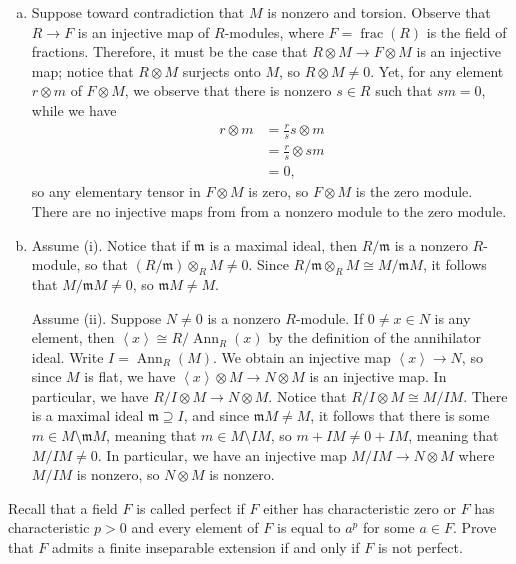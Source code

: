 \documentclass[10pt]{mypackage}
\begin{document}
\begin{solution}\hfill
  \begin{enumerate}[(a)]
    \item Suppose toward contradiction that $M$ is nonzero and torsion. Observe that $R\rightarrow F$ is an injective map of $R$-modules, where $F = \operatorname{frac}\left( R \right)$ is the field of fractions. Therefore, it must be the case that $R\otimes M\rightarrow F\otimes M$ is an injective map; notice that $R\otimes M$ surjects onto $M$, so $R\otimes M\neq 0$. Yet, for any element $r\otimes m$ of $F\otimes M$, we observe that there is nonzero $s\in R$ such that $sm = 0$, while we have
      \begin{align*}
        r\otimes m &= \frac{r}{s}s\otimes m\\
                   &= \frac{r}{s}\otimes sm\\
                   &= 0,
      \end{align*}
      so any elementary tensor in $F\otimes M$ is zero, so $F\otimes M$ is the zero module. There are no injective maps from from a nonzero module to the zero module.
    \item Assume (i). Notice that if $ \mathfrak{m} $ is a maximal ideal, then $R/ \mathfrak{m}$ is a nonzero $R$-module, so that $\left( R/ \mathfrak{m} \right)\otimes_{R}M\neq 0$. Since $R/ \mathfrak{m}\otimes_{R} M\cong M/ \mathfrak{m}M$, it follows that $ M/ \mathfrak{m}M\neq 0 $, so $ \mathfrak{m}M \neq M $.

      Assume (ii). Suppose $N\neq 0$ is a nonzero $R$-module. If $0\neq x\in N$ is any element, then $ \left\langle x \right\rangle\cong R/\operatorname{Ann}_R(x) $ by the definition of the annihilator ideal. Write $I = \operatorname{Ann}_R(M)$. We obtain an injective map $ \left\langle x \right\rangle\rightarrow N $, so since $M$ is flat, we have $ \left\langle x \right\rangle\otimes M\rightarrow N\otimes M $ is an injective map. In particular, we have $R/I\otimes M\rightarrow N\otimes M$. Notice that $R/I\otimes M\cong M/IM$. There is a maximal ideal $ \mathfrak{m}\supseteq I $, and since $ \mathfrak{m}M\neq M $, it follows that there is some $m\in M\setminus \mathfrak{m}M$, meaning that $m\in M\setminus IM$, so $m + IM\neq 0 + IM$, meaning that $M/IM\neq 0$. In particular, we have an injective map $M/IM\rightarrow N\otimes M$ where $M/IM$ is nonzero, so $N\otimes M$ is nonzero.
  \end{enumerate}
\end{solution}
\begin{problem}[Problem 7]
  Recall that a field $F$ is called perfect if $F$ either has characteristic zero or $F$ has characteristic $p > 0$ and every element of $F$ is equal to $a^{p}$ for some $a\in F$. Prove that $F$ admits a finite inseparable extension if and only if $F$ is not perfect.
\end{problem}
\end{document}

